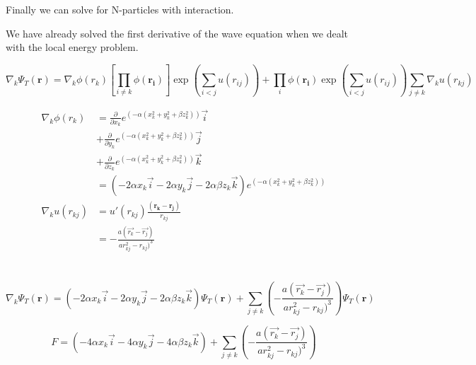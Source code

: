 Finally we can solve for N-particles with interaction.

We have already solved the first derivative of the wave equation when we dealt with the local energy problem.

$$\nabla_k \Psi_T(\mathbf{r}) = \nabla_k \phi(r_k) \left[\prod_{i\ne k} \phi(\mathbf{r_i})\right] \exp \left(\sum_{i<j}u(r_{ij})\right) +  \prod_{i} \phi (\mathbf{r_i}) \exp \left(\sum_{i<j}u(r_{ij})\right) \sum_{j\ne k} \nabla_k u(r_{kj})$$

\begin{align*}
\nabla_k \phi(r_k) &= \frac{\partial}{\partial x_k} e^{(-\alpha (x_k^2 + y_k^2 + \beta z_k^2))} \vec{i} \\
&+ \frac{\partial}{\partial y_k} e^{(-\alpha (x_k^2 + y_k^2 + \beta z_k^2))} \vec{j} \\
&+ \frac{\partial}{\partial z_k} e^{(-\alpha (x_k^2 + y_k^2 + \beta z_k^2))} \vec{k} \\
&= (-2\alpha x_k \vec{i} -2\alpha y_k \vec{j} -2\alpha \beta z_k \vec{k}) e^{(-\alpha (x_k^2 + y_k^2 + \beta z_k^2))}\\
\nabla_k u(r_{kj}) &= u'(r_{kj}) \frac{(\mathbf{r_k} - \mathbf{r_j})}{r_{kj}}\\
&= - \frac{a(\vec{r_k} - \vec{r_j})}{ar_{kj}^2 - r_{kj})^3}
\end{align*}
\\
\\

$$\nabla_k \Psi_T(\mathbf{r}) = (-2\alpha x_k \vec{i} - 2\alpha y_k \vec{j} - 2\alpha \beta z_k \vec{k}) \Psi_T(\mathbf{r})  + \sum_{j \ne k} \left( - \frac{a(\vec{r_k} - \vec{r_j})}{ar_{kj}^2 - r_{kj})^3} \right)\Psi_T(\mathbf{r})$$

$$F = (-4\alpha x_k \vec{i} - 4\alpha y_k \vec{j} - 4\alpha \beta z_k \vec{k}) + \sum_{j \ne k} \left( - \frac{a(\vec{r_k} - \vec{r_j})}{ar_{kj}^2 - r_{kj})^3} \right)$$

